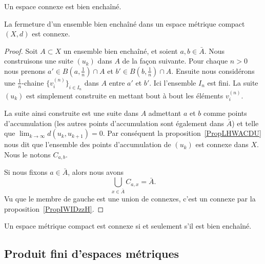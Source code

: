 \begin{proposition}
    Un espace connexe est bien enchaîné.
\end{proposition}

\begin{proposition}
    La fermeture d'un ensemble bien enchaîné dans un espace métrique compact \( (X,d)\) est connexe.
\end{proposition}

\begin{proof}
    Soit \( A\subset X\) un ensemble bien enchaîné, et soient \( a,b\in \bar A\). Nous construisons une suite \( (u_k)\) dans \( A\) de la façon suivante. Pour chaque \( n>0\) nous prenons \( a'\in B(a,\frac{1}{ n })\cap A\) et \( b'\in B(b,\frac{1}{ n })\cap A\). Ensuite nous considérons une \( \frac{1}{ n }\)-chaine \( \{ v_i^{(n)} \}_{i\in I_n}\) dans \( A\) entre \( a'\) et \( b'\). Ici l'ensemble \( I_n\) est fini. La suite \( (u_k)\) est simplement construite en mettant bout à bout les éléments \( v_i^{(n)}\).

    La suite ainsi construite est une suite dans \( A\) admettant \( a\) et \( b\) comme points d'accumulation (les autres points d'accumulation sont également dans \( \bar A\)) et telle que \( \lim_{k\to \infty} d(u_k,u_{k+1})=0\). Par conséquent la proposition~\ref{PropLHWACDU} nous dit que l'ensemble des points d'accumulation de \( (u_k)\) est connexe dans \( X\). Nous le notons \( C_{a,b}\).

    Si nous fixons \( a\in \bar A\), alors nous avons
    \begin{equation}
        \bigcup_{x\in \bar A}C_{a,x}=\bar A.
    \end{equation}
    Vu que le membre de gauche est une union de connexes, c'est un connexe par la proposition~\ref{PropIWIDzzH}.
\end{proof}

\begin{corollary}       \label{CORooSIKCooTncoQm}
    Un espace métrique compact est connexe si et seulement s'il est bien enchaîné.
\end{corollary}

\subsection{Produit fini d'espaces métriques}

